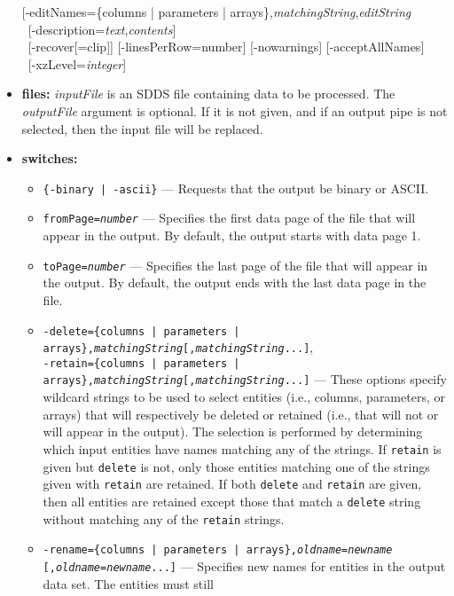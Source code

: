 \begin{itemize}
\begin{flushleft}
{[-editNames=\{columns | parameters | arrays\},{\em matchingString},{\em editString} \\ \ 
[-description={\em text},{\em contents}] \\ \ 
[-recover[=clip]] [-linesPerRow={\rm number}] [-nowarnings] [-acceptAllNames]\\ \ 
[-xzLevel={\em integer}] \
}\end{flushleft}
\item {\bf files:}
{\em inputFile} is an SDDS file containing data to be processed.  The {\em outputFile} argument is
optional.  If it is not given, and if an output pipe is not selected, then the input file will be
replaced.
\item {\bf switches:}
    \begin{itemize}
    \item {\tt \{-binary | -ascii\}} --- Requests that the output be binary or ASCII.
    \item {\tt fromPage={\em number}} --- Specifies the first data page of the file that will appear in the output.
        By default, the output starts with data page 1.
    \item {\tt toPage={\em number}} --- Specifies the last page of the file that will appear in the output.
        By default, the output ends with the last data page in the file.
    \item {\tt -delete=\{columns | parameters | arrays\},{\em matchingString}[,{\em matchingString}...]},\\
        {\tt -retain=\{columns | parameters | arrays\},{\em matchingString}[,{\em matchingString}...]}
         --- These options specify wildcard strings to be used to select entities
        (i.e., columns, parameters, or arrays) that will respectively be deleted or retained (i.e., that will not or
        will appear in the output).   
        The selection is performed by determining which input entities have names matching any of the strings.
        If \verb|retain| is given but \verb|delete| is not, only those entities matching one of the
        strings given with \verb|retain| are retained.  If both \verb|delete| and \verb|retain|
        are given, then all entities are retained except those that match a \verb|delete| string without
        matching any of the \verb|retain| strings.
    \item {\tt -rename=\{columns | parameters | arrays\},{\em oldname}={\em newname}}\\
        {\tt [,{\em oldname}={\em newname}...]} 
        --- Specifies new names for entities in the output data set.  The entities must still

\end{itemize}
\end{itemize}
